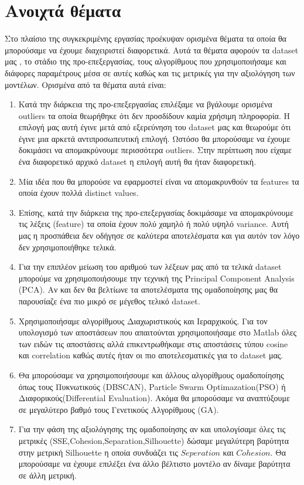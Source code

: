 \chapter{Ανοιχτά θέματα}
Στο πλαίσιο της συγκεκριμένης εργασίας προέκυψαν ορισμένα θέματα τα οποία θα μπορούσαμε να έχουμε διαχειριστεί διαφορετικά. Αυτά τα θέματα αφορούν τα dataset μας , το στάδιο της προ-επεξεργασίας, τους αλγορίθμους που χρησιμοποιήσαμε και διάφορες παραμέτρους μέσα σε αυτές καθώς και τις μετρικές για την αξιολόγηση των μοντέλων. Ορισμένα από τα θέματα αυτά είναι:

\begin{enumerate}
    \item Κατά την διάρκεια της προ-επεξεργασίας επιλέξαμε να βγάλουμε ορισμένα outliers τα οποία θεωρήθηκε ότι δεν προσδίδουν καμία χρήσιμη πληροφορία. Η επιλογή μας αυτή έγινε μετά από εξερεύνηση του dataset μας και θεωρούμε ότι έγινε μια αρκετά αντιπροσωπευτική επιλογή. Ωστόσο θα μπορούσαμε να έχουμε δοκιμάσει να απομακρύνουμε περισσότερα outliers. Στην περίπτωση που είχαμε ένα διαφορετικό αρχικό dataset η επιλογή αυτή θα ήταν διαφορετική.
    \item Μία ιδέα που θα μπορούσε να εφαρμοστεί είναι να απομακρυνθούν τα features τα οποία έχουν πολλά distinct values.
    \item Επίσης, κατά την διάρκεια της προ-επεξεργασίας δοκιμάσαμε να απομακρύνουμε τις λέξεις (feature) τα οποία έχουν πολύ χαμηλό ή πολύ υψηλό variance. Αυτή μας η προσπάθεια δεν οδήγησε σε καλύτερα αποτελέσματα και για αυτόν τον λόγο δεν χρησιμοποιήθηκε τελικά.
    \item Για την επιπλέον μείωση του αριθμού των λέξεων μας από τα τελικά dataset μπορούμε να χρησιμοποιήσουμε την τεχνική της Principal Component Analysis (PCA). Αν και δεν θα βελτίωνε τα αποτελέσματα της ομαδοποίησης μας θα παρουσίαζε ένα πιο μικρό σε μέγεθος τελικό dataset.
    \item Χρησιμοποιήσαμε αλγορίθμους Διαχωριστικούς και Ιεραρχικούς. Για τον υπολογισμό των αποστάσεων που απαιτούνται χρησιμοποιήσαμε στο Matlab όλες των ειδών τις αποστάσεις αλλά επικεντρωθήκαμε στις αποστάσεις τύπου cosine και correlation καθώς αυτές ήταν οι πιο αποτελεσματικές για το dataset μας.
    \item Θα μπορούσαμε να χρησιμοποιήσουμε και άλλους αλγορίθμους ομαδοποίησης όπως τους Πυκνωτικούς (DBSCAN), Particle Swarm Optimazation(PSO) ή Διαφορικούς(Differential Evaluation). Ακόμα θα μπορούσαμε να αναπτύξουμε σε μεγαλύτερο βαθμό τους Γενετικούς Αλγορίθμους (GA).
    \item Για την φάση της αξιολόγησης της ομαδοποίησης αν και υπολογίσαμε όλες τις μετρικές (SSE,Cohesion,Separation,Silhouette) δώσαμε μεγαλύτερη βαρύτητα στην μετρική Silhouette η οποία συνδυάζει τις $Seperation$ και $Cohesion$. Θα μπορούσαμε να έχουμε επιλέξει ένα άλλο βέλτιστο μοντέλο αν δίναμε βαρύτητα σε άλλη μετρική.

\end{enumerate}
